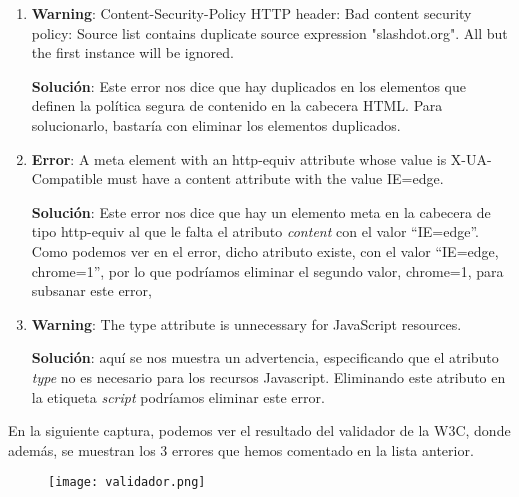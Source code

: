 \begin{enumerate}
    \item \textbf{Warning}: Content-Security-Policy HTTP header: Bad content security policy: Source list contains duplicate source expression "slashdot.org". All but the first instance will be ignored.

    \textbf{Solución}: Este error nos dice que hay duplicados en los elementos que definen la política segura de contenido en la cabecera HTML. Para solucionarlo, bastaría con eliminar los elementos duplicados.

    \item \textbf{Error}: A meta element with an http-equiv attribute whose value is X-UA-Compatible must have a content attribute with the value IE=edge.

    \textbf{Solución}: Este error nos dice que hay un elemento meta en la cabecera de tipo http-equiv al que le falta el atributo \textit{content} con el valor ``IE=edge''. Como podemos ver en el error, dicho atributo existe, con el valor ``IE=edge, chrome=1'', por lo que podríamos eliminar el segundo valor, chrome=1, para subsanar este error,

    \item \textbf{Warning}: The type attribute is unnecessary for JavaScript resources.

    \textbf{Solución}: aquí se nos muestra un advertencia, especificando que el atributo \textit{type} no es necesario para los recursos Javascript. Eliminando este atributo en la etiqueta \textit{script} podríamos eliminar este error.
\end{enumerate}

En la siguiente captura, podemos ver el resultado del validador de la W3C, donde además, se muestran los 3 errores que hemos comentado en la lista anterior.

\begin{figure}[H]
    \centering
    \texttt{[image: validador.png]}
\end{figure}




%
%


